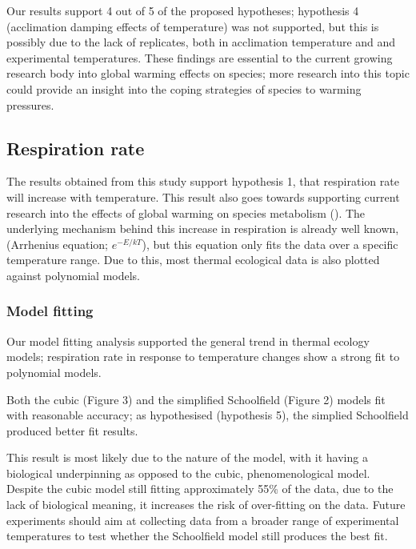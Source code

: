 \documentclass[../../Paper.tex]{subfiles}
\begin{document}
Our results support 4 out of 5 of the proposed hypotheses; hypothesis 4 (acclimation
damping effects of temperature) was not supported, but this is possibly due to the lack of replicates, both 
in acclimation temperature and and experimental temperatures.
These findings are essential to the current growing research body into global warming effects on species; 
more research into this topic could provide an insight into the coping strategies of species to warming pressures. 

\subsection*{Respiration rate}

The results obtained from this study support hypothesis 1, that respiration rate will increase with 
temperature. This result also goes towards supporting current research into the effects of global warming
on species metabolism (\cite{grigaltchik_thermal_2012,sentis_using_2012}). The underlying mechanism behind this increase in respiration is already
well known, (Arrhenius equation; $e^{−E/kT}$), but this equation only fits the data over a specific temperature
range. Due to this, most thermal ecological data is also plotted against polynomial models.

\subsubsection*{Model fitting}

Our model fitting analysis supported the general trend in thermal ecology models; respiration rate in
response to temperature changes show a strong fit to polynomial models. 

Both the cubic (Figure 3) and the simplified 
Schoolfield (Figure 2) models fit with reasonable accuracy; as hypothesised (hypothesis 5), the simplied 
Schoolfield produced better fit results. 

This result is most likely due to the nature of the model, with it having a biological underpinning as
opposed to the cubic, phenomenological model. Despite the cubic model still fitting approximately 
55\% of the data, due to the lack of biological meaning, it increases the risk of over-fitting 
on the data. Future experiments should aim at collecting data from a broader range of experimental temperatures
to test whether the Schoolfield model still produces the best fit. 
\end{document}
